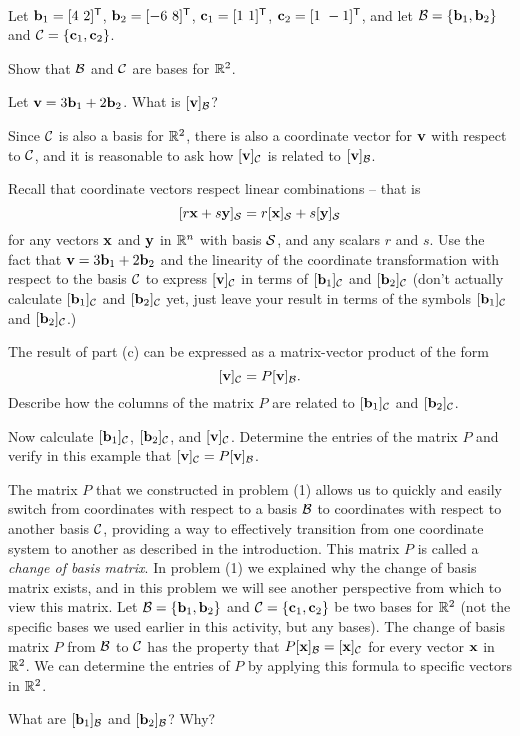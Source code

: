 \begin{pa} \label{pa:3_e_2} ~
\be
\item Let $\mathbf{b}_1 = [4 \ 2]^{\mathsf{T}}$, $\mathbf{b}_2 = [-6 \ 8]^{\mathsf{T}}$, $\mathbf{c}_1 = [1 \ 1 ]^{\mathsf{T}}$, $\mathbf{c}_2 = [1 \ -1]^{\mathsf{T}}$, and let $\mathcal{B} = \{\mathbf{b}_1, \mathbf{b}_2\}$ and $\mathcal{C} = \{\mathbf{c}_1, \mathbf{c}_2\}$.
	\ba
	\item Show that $\mathcal{B}$ and $\mathcal{C}$ are bases for $\mathbb{R}^2$. 
	

	\item Let $\mathbf{v} = 3 \mathbf{b}_1 + 2 \mathbf{b}_2$. What is $[\mathbf{v}]_{\mathcal{B}}$?

	\item Since $\mathcal{C}$ is also a basis for $\mathbb{R}^2$, there is also a coordinate vector for $\mathbf{v}$ with respect to $\mathcal{C}$, and it is reasonable to ask how $[\mathbf{v}]_{\mathcal{C}}$ is related to $[\mathbf{v}]_{\mathcal{B}}$.
	
Recall that coordinate vectors respect linear combinations -- that is
\[[r\mathbf{x} + s\mathbf{y}]_{\mathcal{S}} = r[\mathbf{x}]_{\mathcal{S}} + s[\mathbf{y}]_{\mathcal{S}}\]
for any vectors $\mathbf{x}$ and $\mathbf{y}$ in $\mathbb{R}^n$  with basis $\mathcal{S}$, and any scalars $r$ and $s$. Use the fact that $\mathbf{v} = 3 \mathbf{b}_1 + 2 \mathbf{b}_2$ and the linearity of the coordinate transformation with respect to the basis $\mathcal{C}$ to express $[\mathbf{v}]_{\mathcal{C}}$ in terms of $[\mathbf{b}_1]_{\mathcal{C}}$ and $[\mathbf{b}_2]_{\mathcal{C}}$ (don't actually calculate $[\mathbf{b}_1]_{\mathcal{C}}$ and $[\mathbf{b}_2]_{\mathcal{C}}$ yet, just leave your result in terms of the symbols $[\mathbf{b}_1]_{\mathcal{C}}$ and $[\mathbf{b}_2]_{\mathcal{C}}$.) 

	\item The result of part (c) can be expressed as a matrix-vector product of the form 
\[[\mathbf{v}]_{\mathcal{C}} = P[\mathbf{v}]_{\mathcal{B}}.\]
 Describe how the columns of the matrix $P$ are related to $[\mathbf{b}_1]_{\mathcal{C}}$ and $[\mathbf{b}_2]_{\mathcal{C}}$. 

\item Now calculate $[\mathbf{b}_1]_{\mathcal{C}}$, $[\mathbf{b}_2]_{\mathcal{C}}$, and $[\mathbf{v}]_{\mathcal{C}}$. Determine the entries of the matrix $P$ and verify in this example that $[\mathbf{v}]_{\mathcal{C}} = P[\mathbf{v}]_{\mathcal{B}}$. 


	\ea

\item The matrix $P$ that we constructed in problem (1) allows us to quickly and easily switch from coordinates with respect to a basis $\mathcal{B}$ to coordinates with respect to another basis $\mathcal{C}$, providing a way to effectively transition from one coordinate system to another as described in the introduction. This matrix $P$ is called a \emph{change of basis matrix}. In problem (1) we explained why the change of basis matrix exists, and in this problem we will see another perspective from which to view this matrix. Let $\mathcal{B} = \{\mathbf{b}_1, \mathbf{b}_2\}$ and $\mathcal{C} = \{\mathbf{c}_1, \mathbf{c}_2\}$ be two bases for $\mathbb{R}^2$ (not the specific bases we used earlier in this activity, but any bases).  The change of basis matrix $P$ from $\mathcal{B}$ to $\mathcal{C}$ has the property that $P[\mathbf{x}]_{\mathcal{B}} = [\mathbf{x}]_{\mathcal{C}}$ for every vector $\mathbf{x}$ in $\mathbb{R}^2$. We can determine the entries of $P$ by applying this formula to specific vectors in $\mathbb{R}^2$. 
	\ba
	\item What are $[\mathbf{b}_1]_{\mathcal{B}}$ and $[\mathbf{b}_2]_{\mathcal{B}}$? Why?



\end{pa}
